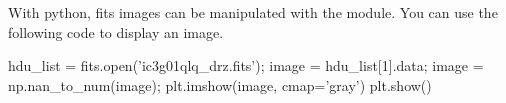 \begin{pcomment}
\begin{premark}
 With python, fits images can be manipulated with the  module. You can use the following code to display an image.
\end{premark}
 \begin{python}
hdu_list = fits.open('ic3g01qlq_drz.fits');
image = hdu_list[1].data;
image = np.nan_to_num(image);
plt.imshow(image, cmap='gray')
plt.show()
 \end{python}
\end{pcomment}
